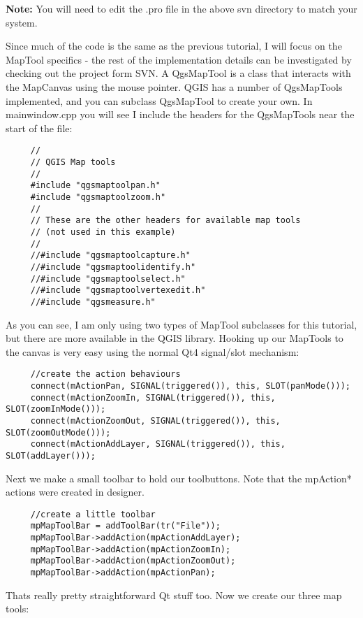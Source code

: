 \textbf{Note:} You will need to edit the .pro file in the above svn directory to
match your system.

Since much of the code is the same as the previous tutorial, I will focus on
the MapTool specifics - the rest of the implementation details can be
investigated by checking out the project form SVN. A QgsMapTool is a class that
interacts with the MapCanvas using the mouse pointer. QGIS has a number of
QgsMapTools implemented, and you can subclass QgsMapTool to create your own. In
mainwindow.cpp you will see I include the headers for the QgsMapTools near the
start of the file:

\begin{verbatim}
     //
     // QGIS Map tools
     //
     #include "qgsmaptoolpan.h"
     #include "qgsmaptoolzoom.h"
     //
     // These are the other headers for available map tools 
     // (not used in this example)
     //
     //#include "qgsmaptoolcapture.h"
     //#include "qgsmaptoolidentify.h"
     //#include "qgsmaptoolselect.h"
     //#include "qgsmaptoolvertexedit.h"
     //#include "qgsmeasure.h"
\end{verbatim}

As you can see, I am only using two types of MapTool subclasses for this
tutorial, but there are more available in the QGIS library. Hooking up our
MapTools to the canvas is very easy using the normal Qt4 signal/slot mechanism:

\begin{verbatim}
     //create the action behaviours
     connect(mActionPan, SIGNAL(triggered()), this, SLOT(panMode()));
     connect(mActionZoomIn, SIGNAL(triggered()), this, SLOT(zoomInMode()));
     connect(mActionZoomOut, SIGNAL(triggered()), this, SLOT(zoomOutMode()));
     connect(mActionAddLayer, SIGNAL(triggered()), this, SLOT(addLayer()));
\end{verbatim}

Next we make a small toolbar to hold our toolbuttons. Note that the mpAction*
actions were created in designer.

\begin{verbatim}
     //create a little toolbar
     mpMapToolBar = addToolBar(tr("File"));
     mpMapToolBar->addAction(mpActionAddLayer);
     mpMapToolBar->addAction(mpActionZoomIn);
     mpMapToolBar->addAction(mpActionZoomOut);
     mpMapToolBar->addAction(mpActionPan);
\end{verbatim}

Thats really pretty straightforward Qt stuff too. Now we create our three map
tools:

